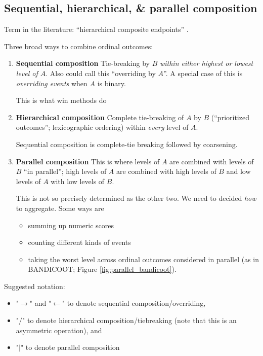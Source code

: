 \documentclass[
  11pt,
  fleqn
]{article}
\begin{document}
\subsection{Sequential,
hierarchical, \& parallel composition}

Term in the literature: ``hierarchical composite endpoints''
\citep{gasparyanDesignAnalysisStudies2022}.

Three broad ways to combine ordinal outcomes:
\begin{enumerate}
  \item \textbf{Sequential composition} Tie-breaking by $B$
    \emph{within either highest or lowest level of $A$}. Also could
    call this ``overriding by $A$''. A special case of this is
    \emph{overriding events} when $A$ is binary.

    This is what win methods do 
  \item \textbf{Hierarchical composition} Complete tie-breaking of $A$ by
    $B$ (``prioritized outcomes''; lexicographic ordering) within
    \emph{every} level of $A$.

    Sequential composition is complete-tie breaking followed by coarsening.

  \item \textbf{Parallel composition} This is where levels of $A$ are
    combined with levels of $B$ ``in parallel''; high levels of $A$
    are combined with high levels of $B$ and low levels of $A$ with
    low levels of $B$.

    This is not so precisely determined as the other two. We need to
    decided \emph{how} to aggregate. Some ways are
    \begin{itemize}
      \item summing up numeric
        scores
      \item counting different kinds of events
      \item taking the worst level across ordinal outcomes considered
        in parallel (as in BANDICOOT; Figure \ref{fig:parallel_bandicoot}).
    \end{itemize}
\end{enumerate}

Suggested notation:
\begin{itemize}
  \item "$\rightarrow$" and "$\leftarrow$" to denote sequential
    composition/overriding,
  \item "$/$" to denote hierarchical composition/tiebreaking
    (note that this is an asymmetric operation), and
  \item "$|$" to denote parallel composition
\end{itemize}
\end{document}
